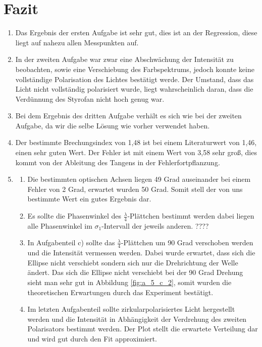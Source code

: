 \documentclass[12pt]{scrartcl}
\begin{document}
\section{Fazit}

\begin{enumerate}
\item	Das Ergebnis der ersten Aufgabe ist sehr gut, dies ist an der Regression, diese liegt auf nahezu allen Messpunkten auf.

\item	In der zweiten Aufgabe war zwar eine Abschwächung der Intensität zu beobachten, sowie eine Verschiebung des Farbspektrums, jedoch konnte keine vollständige Polarisation des Lichtes bestätigt werde. Der Umstand, dass das Licht nicht vollständig polarisiert wurde, liegt wahrscheinlich daran, dass die Verdünnung des Styrofan nicht hoch genug war.

\item Bei dem Ergebnis des dritten Aufgabe verhält es sich wie bei der zweiten Aufgabe, da wir die selbe Lösung wie vorher verwendet haben.

\item Der bestimmte Brechungsindex von 1,48 ist bei einem Literaturwert von 1,46, einen sehr guten Wert. Der Fehler ist mit einem Wert von 3,58 sehr groß, dies kommt von der Ableitung des Tangens in der Fehlerfortpflanzung.

\item
\begin{enumerate}
\item Die bestimmten optischen Achsen liegen 49 Grad auseinander bei einem Fehler von 2 Grad, erwartet wurden 50 Grad. Somit stell der von uns bestimmte Wert ein gutes Ergebnis dar.

\item Es sollte die Phasenwinkel des $\frac{\lambda}{4}$-Plättchen bestimmt werden dabei liegen alle Phasenwinkel im $\sigma_1$-Intervall der jeweils anderen. ????

\item In Aufgabenteil c) sollte das $\frac{\lambda}{4}$-Plättchen um 90 Grad verschoben werden und die Intensität vermessen werden. Dabei wurde erwartet, dass sich die Ellipse nicht verschiebt sondern sich nur die Drehrichtung der Welle ändert. Das sich die Ellipse nicht verschiebt bei der 90 Grad Drehung sieht man sehr gut in Abbildung \ref{fig:a_5_c_2}, somit wurden die theoretischen Erwartungen durch das Experiment bestätigt.

\item Im letzten Aufgabenteil sollte zirkularpolarisiertes Licht hergestellt werden und die Intensität in Abhängigkeit der Verdrehung des zweiten Polarisators bestimmt werden. Der Plot stellt die erwartete Verteilung dar und wird gut durch den Fit approximiert.
 

\end{enumerate}
\end{enumerate}
\end{document}
